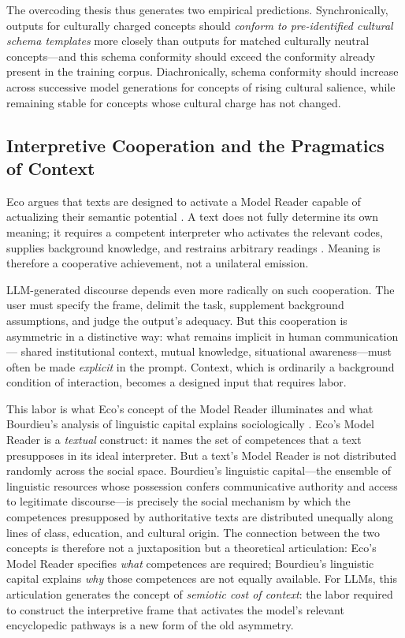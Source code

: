 \documentclass[12pt,a4paper]{article}
\begin{document}
The overcoding thesis thus generates two empirical predictions. Synchronically,
outputs for culturally charged concepts should \emph{conform to pre-identified
cultural schema templates} more closely than outputs for matched culturally
neutral concepts---and this schema conformity should exceed the conformity
already present in the training corpus. Diachronically, schema conformity
should increase across successive model generations for concepts of rising
cultural salience, while remaining stable for concepts whose cultural charge
has not changed.

\subsection{Interpretive Cooperation and the Pragmatics of Context}

Eco argues that texts are designed to activate a Model Reader capable of
actualizing their semantic potential \citep{Eco1979}. A text does not fully
determine its own meaning; it requires a competent interpreter who activates
the relevant codes, supplies background knowledge, and restrains arbitrary
readings \citep{Eco1979,Eco1990}. Meaning is therefore a cooperative
achievement, not a unilateral emission.

LLM-generated discourse depends even more radically on such cooperation.
The user must specify the frame, delimit the task, supplement background
assumptions, and judge the output's adequacy. But this cooperation is
asymmetric in a distinctive way: what remains implicit in human communication---
shared institutional context, mutual knowledge, situational awareness---must
often be made \emph{explicit} in the prompt. Context, which is ordinarily a
background condition of interaction, becomes a designed input that requires
labor.

This labor is what Eco's concept of the Model Reader illuminates and what
Bourdieu's analysis of linguistic capital explains sociologically
\citep{Bourdieu1991}. Eco's Model Reader is a \emph{textual} construct: it
names the set of competences that a text presupposes in its ideal interpreter.
But a text's Model Reader is not distributed randomly across the social
space. Bourdieu's linguistic capital---the ensemble of linguistic resources
whose possession confers communicative authority and access to legitimate
discourse---is precisely the social mechanism by which the competences
presupposed by authoritative texts are distributed unequally along lines
of class, education, and cultural origin. The connection between the two
concepts is therefore not a juxtaposition but a theoretical articulation:
Eco's Model Reader specifies \emph{what} competences are required; Bourdieu's
linguistic capital explains \emph{why} those competences are not equally
available. For LLMs, this articulation generates the concept of
\emph{semiotic cost of context}: the labor required to construct the
interpretive frame that activates the model's relevant encyclopedic pathways
is a new form of the old asymmetry.
\end{document}
